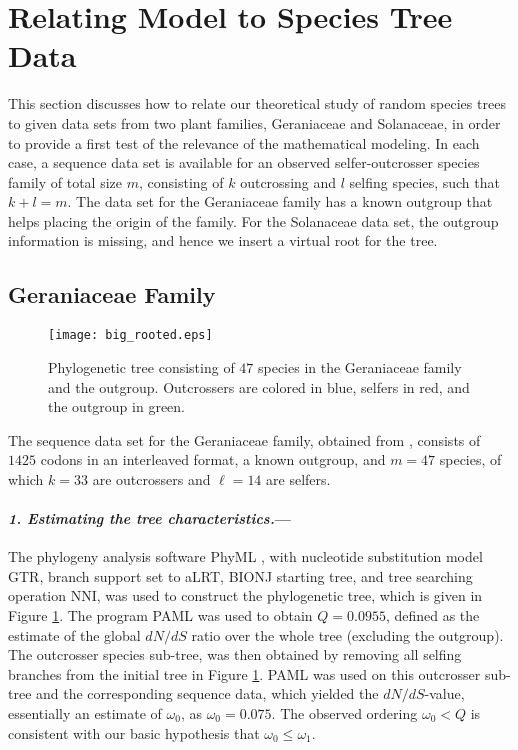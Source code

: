 \documentclass[a4paper,11pt]{article}
\theoremstyle{plain}
\theoremstyle{definition}
\numberwithin{equation}{section}
\begin{document}
\section{ Relating Model to Species Tree Data}



This section discusses how to relate our theoretical study 
of random species trees to given data sets from 
two plant families, Geraniaceae and Solanaceae, in order to provide
a first test of the relevance of the mathematical modeling.   
In each case, a sequence data set is available for an observed
selfer-outcrosser species family of total size $m$, consisting of $k$
outcrossing and $l$ selfing species, such that $k+l=m$. 
The data set for the Geraniaceae family has a known outgroup that helps
placing the origin of the family. For the Solanaceae data set, the outgroup
information is missing, and hence we insert a virtual root for the
tree.




\subsection*{Geraniaceae Family}


\begin{figure}[!t]
\centerline{\texttt{[image: big\_rooted.eps]}}
\caption{  Phylogenetic tree consisting of $47$ species in the
  Geraniaceae family and the outgroup. Outcrossers are colored in blue, selfers in
  red, and the outgroup in green.
  }
\label{big_rooted}
\end{figure}


The sequence data set for the Geraniaceae family, 
obtained from \cite{glemin_muyle}, 
consists of $1425$ codons in an interleaved format, 
a known outgroup, and $m=47$ species, 
of which $k=33$ are outcrossers and $\ell=14$ are
selfers.

\paragraph{\textit{1. Estimating the tree characteristics.}---}
 The phylogeny analysis software PhyML \cite{guindon_gascuel}, 
 with nucleotide substitution model GTR, branch support set to aLRT, 
 BIONJ starting tree, and tree searching operation NNI, was used to 
 construct the phylogenetic tree, which is given in Figure \ref{big_rooted}. 
The program PAML \cite{yang} was used to obtain $Q=0.0955$, 
defined as the estimate of the global $dN/dS$ ratio over the whole tree 
(excluding the outgroup). The outcrosser species sub-tree, was then obtained
by removing all selfing branches from the initial tree in Figure \ref{big_rooted}. 
PAML was used on this outcrosser sub-tree and the corresponding 
sequence data, which yielded the $dN/dS$-value, 
essentially an estimate of $\omega_0$, as $\omega_0=0.075$. 
The observed ordering $\omega_0<Q$ is consistent 
with our basic hypothesis that $\omega_0\le \omega_1$.
\end{document}
